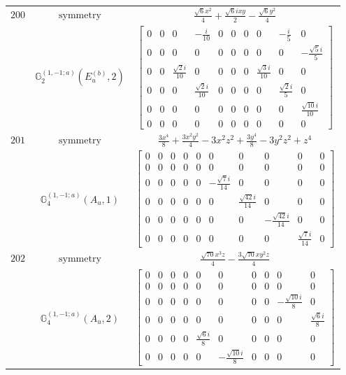 \documentclass[fleqn,8pt,landscape]{jsarticle}
\begin{document}
\begin{longtable}{ccc}
$ 200 $ & $ \text{symmetry} $ & $ \frac{\sqrt{6} x^{2}}{4} + \frac{\sqrt{6} i x y}{2} - \frac{\sqrt{6} y^{2}}{4} $ \\
$  $ & $ \mathbb{G}_{2}^{(1,-1;a)}(E_{u}^{(b)},2) $ & $ \begin{bmatrix} 0 & 0 & 0 & - \frac{i}{10} & 0 & 0 & 0 & 0 & - \frac{i}{5} & 0 \\ 0 & 0 & 0 & 0 & 0 & 0 & 0 & 0 & 0 & - \frac{\sqrt{5} i}{5} \\ 0 & 0 & \frac{\sqrt{2} i}{10} & 0 & 0 & 0 & 0 & \frac{\sqrt{3} i}{10} & 0 & 0 \\ 0 & 0 & 0 & \frac{\sqrt{2} i}{10} & 0 & 0 & 0 & 0 & \frac{\sqrt{2} i}{5} & 0 \\ 0 & 0 & 0 & 0 & 0 & 0 & 0 & 0 & 0 & \frac{\sqrt{10} i}{10} \\ 0 & 0 & 0 & 0 & 0 & 0 & 0 & 0 & 0 & 0 \end{bmatrix} $ \\ \hline
$ 201 $ & $ \text{symmetry} $ & $ \frac{3 x^{4}}{8} + \frac{3 x^{2} y^{2}}{4} - 3 x^{2} z^{2} + \frac{3 y^{4}}{8} - 3 y^{2} z^{2} + z^{4} $ \\
$  $ & $ \mathbb{G}_{4}^{(1,-1;a)}(A_{u},1) $ & $ \begin{bmatrix} 0 & 0 & 0 & 0 & 0 & 0 & 0 & 0 & 0 & 0 \\ 0 & 0 & 0 & 0 & 0 & 0 & 0 & 0 & 0 & 0 \\ 0 & 0 & 0 & 0 & 0 & - \frac{\sqrt{7} i}{14} & 0 & 0 & 0 & 0 \\ 0 & 0 & 0 & 0 & 0 & 0 & \frac{\sqrt{42} i}{14} & 0 & 0 & 0 \\ 0 & 0 & 0 & 0 & 0 & 0 & 0 & - \frac{\sqrt{42} i}{14} & 0 & 0 \\ 0 & 0 & 0 & 0 & 0 & 0 & 0 & 0 & \frac{\sqrt{7} i}{14} & 0 \end{bmatrix} $ \\ \hline
$ 202 $ & $ \text{symmetry} $ & $ \frac{\sqrt{70} x^{3} z}{4} - \frac{3 \sqrt{70} x y^{2} z}{4} $ \\
$  $ & $ \mathbb{G}_{4}^{(1,-1;a)}(A_{u},2) $ & $ \begin{bmatrix} 0 & 0 & 0 & 0 & 0 & 0 & 0 & 0 & 0 & 0 \\ 0 & 0 & 0 & 0 & 0 & 0 & 0 & 0 & 0 & 0 \\ 0 & 0 & 0 & 0 & 0 & 0 & 0 & 0 & - \frac{\sqrt{10} i}{8} & 0 \\ 0 & 0 & 0 & 0 & 0 & 0 & 0 & 0 & 0 & \frac{\sqrt{6} i}{8} \\ 0 & 0 & 0 & 0 & \frac{\sqrt{6} i}{8} & 0 & 0 & 0 & 0 & 0 \\ 0 & 0 & 0 & 0 & 0 & - \frac{\sqrt{10} i}{8} & 0 & 0 & 0 & 0 \end{bmatrix} $ \\ \hline

\end{longtable}
\end{document}
